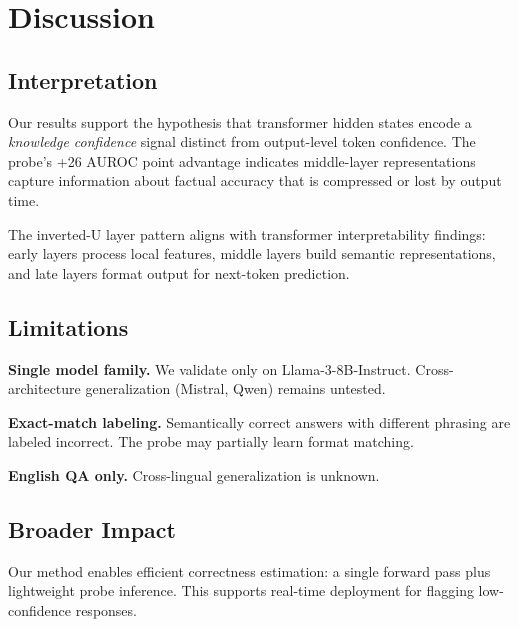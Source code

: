 \section{Discussion}

\subsection{Interpretation}

Our results support the hypothesis that transformer hidden states encode a \emph{knowledge confidence} signal distinct from output-level token confidence. The probe's +26 AUROC point advantage indicates middle-layer representations capture information about factual accuracy that is compressed or lost by output time.

The inverted-U layer pattern aligns with transformer interpretability findings: early layers process local features, middle layers build semantic representations, and late layers format output for next-token prediction.

\subsection{Limitations}

\textbf{Single model family.} We validate only on Llama-3-8B-Instruct. Cross-architecture generalization (Mistral, Qwen) remains untested.

\textbf{Exact-match labeling.} Semantically correct answers with different phrasing are labeled incorrect. The probe may partially learn format matching.

\textbf{English QA only.} Cross-lingual generalization is unknown.

\subsection{Broader Impact}

Our method enables efficient correctness estimation: a single forward pass plus lightweight probe inference. This supports real-time deployment for flagging low-confidence responses.

